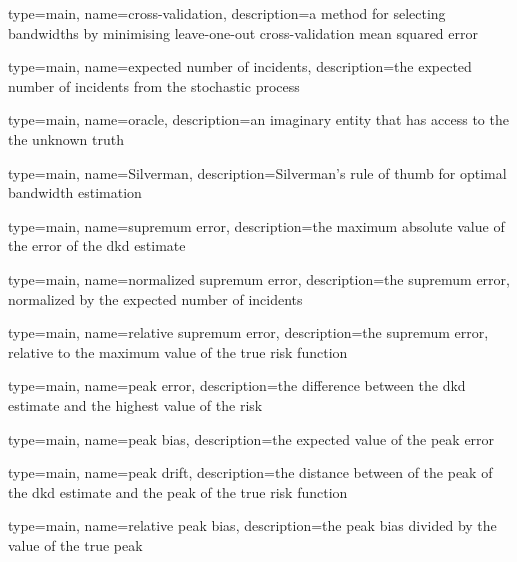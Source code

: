 

{%
   type=main,
   name={cross-validation},
   description={a method for selecting bandwidths by minimising leave-one-out cross-validation mean squared error}
}

{%
   type=main,
   name={expected number of incidents},
   description={the expected number of incidents from the stochastic process}
}

{
   type=main,
   name={oracle},
   description={an imaginary entity that has access to the the unknown truth}
}

{
   type=main,
   name={Silverman},
   description={Silverman's rule of thumb for optimal bandwidth estimation}
}

{%
   type=main,
   name={supremum error},
   description={the maximum absolute value of the error of the dkd estimate}
}

{%
   type=main,
   name={normalized supremum error},
   description={the supremum error, normalized by the expected number of incidents}
}

{%
   type=main,
   name={relative supremum error},
   description={the supremum error, relative to the maximum value of the true risk function}
}

{%
   type=main,
   name={peak error},
   description={the difference between the dkd estimate and the highest value of the risk}
}

{%
   type=main,
   name={peak bias},
   description={the expected value of the peak error}
}

{%
   type=main,
   name={peak drift},
   description={the distance between of the peak of the dkd estimate and the peak of the true risk function}
}

{%
   type=main,
   name={relative peak bias},
   description={the \gls{peak bias} divided by the value of the true peak}
}

